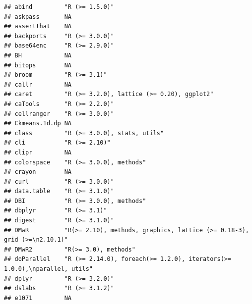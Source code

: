 \documentclass[]{article}
\begin{document}
\begin{verbatim}
## abind         "R (>= 1.5.0)"                                                           
## askpass       NA                                                                       
## assertthat    NA                                                                       
## backports     "R (>= 3.0.0)"                                                           
## base64enc     "R (>= 2.9.0)"                                                           
## BH            NA                                                                       
## bitops        NA                                                                       
## broom         "R (>= 3.1)"                                                             
## callr         NA                                                                       
## caret         "R (>= 3.2.0), lattice (>= 0.20), ggplot2"                               
## caTools       "R (>= 2.2.0)"                                                           
## cellranger    "R (>= 3.0.0)"                                                           
## Ckmeans.1d.dp NA                                                                       
## class         "R (>= 3.0.0), stats, utils"                                             
## cli           "R (>= 2.10)"                                                            
## clipr         NA                                                                       
## colorspace    "R (>= 3.0.0), methods"                                                  
## crayon        NA                                                                       
## curl          "R (>= 3.0.0)"                                                           
## data.table    "R (>= 3.1.0)"                                                           
## DBI           "R (>= 3.0.0), methods"                                                  
## dbplyr        "R (>= 3.1)"                                                             
## digest        "R (>= 3.1.0)"                                                           
## DMwR          "R(>= 2.10), methods, graphics, lattice (>= 0.18-3), grid (>=\n2.10.1)"  
## DMwR2         "R(>= 3.0), methods"                                                     
## doParallel    "R (>= 2.14.0), foreach(>= 1.2.0), iterators(>= 1.0.0),\nparallel, utils"
## dplyr         "R (>= 3.2.0)"                                                           
## dslabs        "R (>= 3.1.2)"                                                           
## e1071         NA                                                                       

\end{verbatim}
\end{document}
